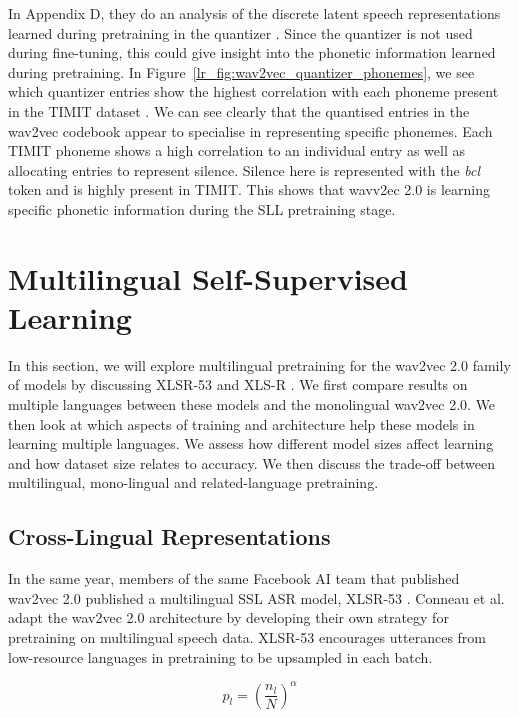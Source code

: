 In Appendix D, they do an analysis of the discrete latent speech representations learned during pretraining in the quantizer \cite{wav2vec}. Since the quantizer is not used during fine-tuning, this could give insight into the phonetic information learned during pretraining. In Figure~\ref{lr_fig:wav2vec_quantizer_phonemes}, we see which quantizer entries show the highest correlation with each phoneme present in the TIMIT dataset \cite{timit}. We can see clearly that the quantised entries in the wav2vec codebook appear to specialise in representing specific phonemes. Each TIMIT phoneme shows a high correlation to an individual entry as well as allocating entries to represent silence. Silence here is represented with the \textit{bcl} token and is highly present in TIMIT. This shows that wavv2ec 2.0 is learning specific phonetic information during the SLL pretraining stage.

\section{Multilingual Self-Supervised Learning}\label{lr_sec:multilingual_ssl}
In this section, we will explore multilingual pretraining for the wav2vec 2.0 \cite{wav2vec} family of models by discussing XLSR-53 \cite{XLSR-53} and XLS-R \cite{babu2021xlsr}. We first compare results on multiple languages between these models and the monolingual wav2vec 2.0. We then look at which aspects of training and architecture help these models in learning multiple languages. We assess how different model sizes affect learning and how dataset size relates to accuracy. We then discuss the trade-off between multilingual, mono-lingual and related-language pretraining.

\subsection{Cross-Lingual Representations}
In the same year, members of the same Facebook AI team that published wav2vec 2.0 \cite{wav2vec} published a multilingual SSL ASR model, XLSR-53 \cite{XLSR-53}. Conneau et al. \cite{XLSR-53} adapt the wav2vec 2.0 architecture by developing their own strategy for pretraining on multilingual speech data. XLSR-53 encourages utterances from low-resource languages in pretraining to be upsampled in each batch. 

\begin{equation}
    p_l=(\frac{n_l}{N})^\alpha
\end{equation}

